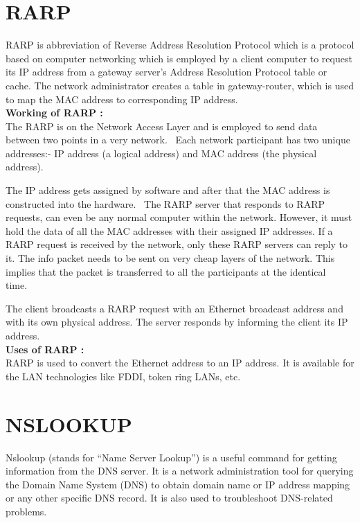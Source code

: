\documentclass[11pt]{article}
\begin{document}
\section{RARP}
RARP is abbreviation of Reverse Address Resolution Protocol which is a protocol based on computer networking which is employed by a client computer to request its IP address from a gateway server’s Address Resolution Protocol table or cache. The network administrator creates a table in gateway-router, which is used to map the MAC address to corresponding IP address. \\[12pt]
\textbf{Working of RARP : \\[12pt]}
The RARP is on the Network Access Layer and is employed to send data between two points in a very network. 
Each network participant has two unique addresses:- IP address (a logical address) and MAC address (the physical address). 

The IP address gets assigned by software and after that the MAC address is constructed into the hardware. 
The RARP server that responds to RARP requests, can even be any normal computer within the network. However, it must hold the data of all the MAC addresses with their assigned IP addresses. If a RARP request is received by the network, only these RARP servers can reply to it. The info packet needs to be sent on very cheap layers of the network. This implies that the packet is transferred to all the participants at the identical time. 

The client broadcasts a RARP request with an Ethernet broadcast address and with its own physical address. The server responds by informing the client its IP address.\\[12pt]
\textbf{Uses of RARP : \\[12pt]}
RARP is used to convert the Ethernet address to an IP address. It is available for the LAN technologies like FDDI, token ring LANs, etc.

\section{NSLOOKUP}
Nslookup (stands for “Name Server Lookup”) is a useful command for getting information from the DNS server. It is a network administration tool for querying the Domain Name System (DNS) to obtain domain name or IP address mapping or any other specific DNS record. It is also used to troubleshoot DNS-related problems. \\[12pt]
\end{document}

